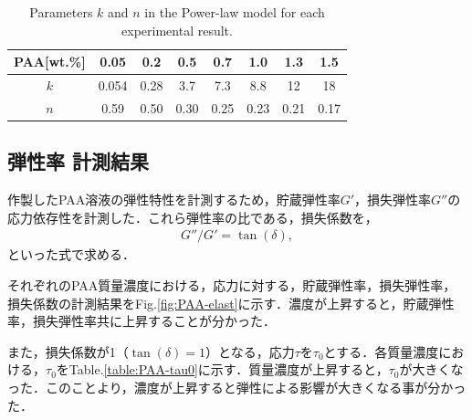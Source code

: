 \begin{table}[h]
	\centering
	\caption{Parameters $k$ and $n$ in the Power-law model for each experimental result.}
	\label{table:power-law}
	\begin{tabular}{c|c|c|c|c|c|c|c} \hline
		PAA[wt.\%] & 0.05  & 0.2  & 0.5  & 0.7  & 1.0  & 1.3  & 1.5  \\ \hline \hline
		$k$        & 0.054 & 0.28 & 3.7  & 7.3  & 8.8  & 12   & 18   \\
		$n$        & 0.59  & 0.50 & 0.30 & 0.25 & 0.23 & 0.21 & 0.17 \\ \hline
	\end{tabular}
\end{table}

\newpage

\subsection{弾性率 計測結果}

作製したPAA溶液の弾性特性を計測するため，貯蔵弾性率$G'$，損失弾性率$G''$の応力依存性を計測した．これら弾性率の比である，損失係数を，
\begin{eqnarray}
	\label{eq:}
	G''/G'=\tan\left(\delta\right) ,
\end{eqnarray}
といった式で求める．

それぞれのPAA質量濃度における，応力に対する，貯蔵弾性率，損失弾性率，損失係数の計測結果をFig.\ref{fig:PAA-elast}に示す．濃度が上昇すると，貯蔵弾性率，損失弾性率共に上昇することが分かった．

また，損失係数が1（$\tan(\delta)=1$）となる，応力$\tau$を$\tau_0$とする．各質量濃度における，$\tau_0$をTable.\ref{table:PAA-tau0}に示す．質量濃度が上昇すると，$\tau_0$が大きくなった．このことより，濃度が上昇すると弾性による影響が大きくなる事が分かった．

